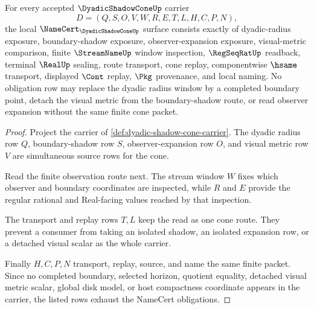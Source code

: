 \begin{theorem}
\label{thm:dyadic-shadow-cone-namecert-obligations}
For every accepted $\DyadicShadowConeUp$ carrier
$$
D=(Q,S,O,V,W,R,E,T,L,H,C,P,N),
$$
the local $\NameCert_{\DyadicShadowConeUp}$ surface consists exactly of dyadic-radius exposure, boundary-shadow exposure, observer-expansion exposure, visual-metric comparison, finite $\StreamNameUp$ window inspection, $\RegSeqRatUp$ readback, terminal $\RealUp$ sealing, route transport, cone replay, componentwise $\hsame$ transport, displayed $\Cont$ replay, $\Pkg$ provenance, and local naming. No obligation row may replace the dyadic radius window by a completed boundary point, detach the visual metric from the boundary-shadow route, or read observer expansion without the same finite cone packet.
\end{theorem}
\begin{proof}
Project the carrier of \autoref{def:dyadic-shadow-cone-carrier}. The dyadic radius row $Q$, boundary-shadow row $S$, observer-expansion row $O$, and visual metric row $V$ are simultaneous source rows for the cone.

Read the finite observation route next. The stream window $W$ fixes which observer and boundary coordinates are inspected, while $R$ and $E$ provide the regular rational and Real-facing values reached by that inspection.

The transport and replay rows $T,L$ keep the read as one cone route. They prevent a consumer from taking an isolated shadow, an isolated expansion row, or a detached visual scalar as the whole carrier.

Finally $H,C,P,N$ transport, replay, source, and name the same finite packet. Since no completed boundary, selected horizon, quotient equality, detached visual metric scalar, global disk model, or host compactness coordinate appears in the carrier, the listed rows exhaust the NameCert obligations.
\end{proof}


